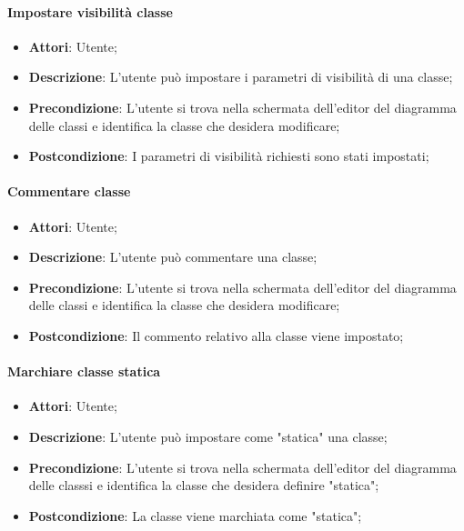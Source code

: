 \paragraph{Impostare visibilità classe}
\begin{itemize}
	\item \textbf{Attori}: Utente;
	\item \textbf{Descrizione}: L'utente può impostare i parametri di visibilità di una classe;
	\item \textbf{Precondizione}: L’utente si trova nella schermata dell’editor del diagramma delle classi e identifica la classe che desidera modificare;
	\item \textbf{Postcondizione}: I parametri di visibilità richiesti sono stati impostati;
\end{itemize}

\paragraph{Commentare classe}
\begin{itemize}
	\item \textbf{Attori}: Utente;
	\item \textbf{Descrizione}: L'utente può commentare una classe;
	\item \textbf{Precondizione}: L’utente si trova nella schermata dell’editor del diagramma delle classi e identifica la classe che desidera modificare;
	\item \textbf{Postcondizione}: Il commento relativo alla classe viene impostato;
\end{itemize}

\paragraph{Marchiare classe statica}
\begin{itemize}
	\item \textbf{Attori}: Utente;
	\item \textbf{Descrizione}: L'utente può impostare come "statica" una classe;
	\item \textbf{Precondizione}: L’utente si trova nella schermata dell’editor del diagramma delle classsi e identifica la classe che desidera definire "statica";
	\item \textbf{Postcondizione}: La classe viene marchiata come "statica";
\end{itemize}


